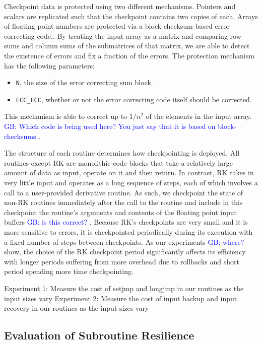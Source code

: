 \documentclass{sig-alternate}
\newcommand{\greg}[1]{%
  \textcolor{blue}{GB: #1}
}
\begin{document}
Checkpoint data is protected using two different mechanisms.
Pointers and scalars are replicated such that the checkpoint contains two copies of each.
Arrays of floating point numbers are protected via a block-checksum-based error correcting code..
By treating the input array as a matrix and comparing row sums and column sums of the submatrices of that matrix, we are able to detect the existence of errors and fix a fraction of the errors.
The protection mechanism has the following parameters:
\begin{itemize}
\item{\texttt{N}, the size of the error correcting sum block.}
\item{\texttt{ECC\_ECC}, whether or not the error correcting code itself should be corrected.}
\end{itemize}
This mechanism is able to correct up to $1/{n^2}$ of the elements in the input array.
\greg{Which code is being used here? You just say that it is based on block-checksums}.

The structure of each routine determines how checkpointing is deployed.
All routines except RK are monolithic code blocks that take a relatively large amount of data as input, operate on it and then return.
In contrast, RK takes in very little input and operates as a long sequence of steps, each of which involves a call to a user-provided derivative routine.
As such, we checkpoint the state of non-RK routines immediately after the call to the routine and include in this checkpoint the routine's arguments and contents of the floating point input buffers \greg{is this correct?}.
Because RK's checkpoints are very small and it is more sensitive to errors, it is checkpointed periodically during its execution with a fixed number of steps between checkpoints.
As our experiments \greg{where?} show, the choice of the RK checkpoint period significantly affects its efficiency with longer periods suffering from more overhead due to rollbacks and short period spending more time checkpointing.

Experiment 1: Measure the cost of setjmp and longjmp in our routines as the input sizes vary
Experiment 2: Measure the cost of input backup and input recovery in our routines as the input sizes vary

\subsection{Evaluation of Subroutine Resilience}
\label{sec:res_tech:eval}
\end{document}

